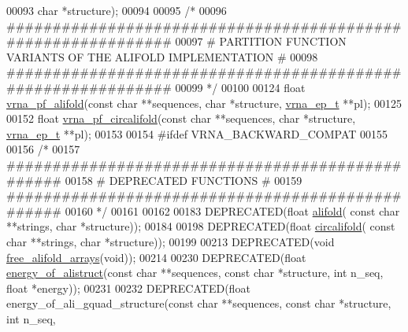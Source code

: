 \begin{DoxyCode}
00093                   \textcolor{keywordtype}{char} *structure);
00094 
00095 \textcolor{comment}{/*}
00096 \textcolor{comment}{#############################################################}
00097 \textcolor{comment}{# PARTITION FUNCTION VARIANTS OF THE ALIFOLD IMPLEMENTATION #}
00098 \textcolor{comment}{#############################################################}
00099 \textcolor{comment}{*/}
00100 
00124 \textcolor{keywordtype}{float} \hyperlink{group__consensus__pf__fold_ga374e31a0f326b2c5da5b84e143a63f38}{vrna\_pf\_alifold}(\textcolor{keyword}{const} \textcolor{keywordtype}{char} **sequences, \textcolor{keywordtype}{char} *structure, 
      \hyperlink{group__struct__utils_structvrna__elem__prob__s}{vrna\_ep\_t} **pl);
00125 
00152 \textcolor{keywordtype}{float} \hyperlink{group__consensus__pf__fold_gab70fe6c9a78b79cc5669881720926e1d}{vrna\_pf\_circalifold}(\textcolor{keyword}{const} \textcolor{keywordtype}{char} **sequences, \textcolor{keywordtype}{char} *structure, 
      \hyperlink{group__struct__utils_structvrna__elem__prob__s}{vrna\_ep\_t} **pl);
00153 
00154 \textcolor{preprocessor}{#ifdef  VRNA\_BACKWARD\_COMPAT}
00155 
00156 \textcolor{comment}{/*}
00157 \textcolor{comment}{#################################################}
00158 \textcolor{comment}{# DEPRECATED FUNCTIONS                          #}
00159 \textcolor{comment}{#################################################}
00160 \textcolor{comment}{*/}
00161 
00162 
00183 DEPRECATED(\textcolor{keywordtype}{float} \hyperlink{group__consensus__mfe__fold_ga4cf00f0659e5f0480335d69e797f05b1}{alifold}( \textcolor{keyword}{const} \textcolor{keywordtype}{char} **strings, \textcolor{keywordtype}{char} *structure));
00184 
00198 DEPRECATED(\textcolor{keywordtype}{float} \hyperlink{group__consensus__mfe__fold_gadbd3b0b1c144cbfb4efe704b2b260f96}{circalifold}( \textcolor{keyword}{const} \textcolor{keywordtype}{char} **strings, \textcolor{keywordtype}{char} *structure));
00199 
00213 DEPRECATED(\textcolor{keywordtype}{void} \hyperlink{group__consensus__mfe__fold_ga72095e4554b5d577250ea14c42acc49e}{free\_alifold\_arrays}(\textcolor{keywordtype}{void}));
00214 
00230 DEPRECATED(\textcolor{keywordtype}{float} \hyperlink{group__consensus__fold_ga1c48869c03b49a342bf4cbdd61900081}{energy\_of\_alistruct}(\textcolor{keyword}{const} \textcolor{keywordtype}{char} **sequences, \textcolor{keyword}{const} \textcolor{keywordtype}{char} *structure, \textcolor{keywordtype}{int} 
      n\_seq, \textcolor{keywordtype}{float} *energy));
00231 
00232 DEPRECATED(\textcolor{keywordtype}{float} energy\_of\_ali\_gquad\_structure(\textcolor{keyword}{const} \textcolor{keywordtype}{char} **sequences, \textcolor{keyword}{const} \textcolor{keywordtype}{char} *structure, \textcolor{keywordtype}{int} n\_seq, \textcolor{keywordtype}{
}
\end{DoxyCode}
